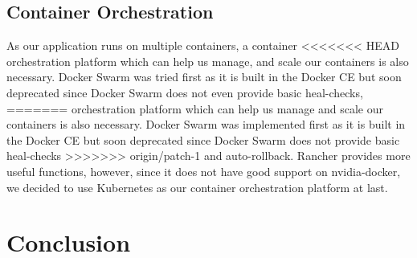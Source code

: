 \documentclass[runningheads]{llncs}
\begin{document}
\subsection{Container Orchestration}
As our application runs on multiple containers, a container 
<<<<<<< HEAD
orchestration platform which can help us manage, and scale 
our containers is also necessary. Docker Swarm was tried 
first as it is built in the Docker CE but soon deprecated 
since Docker Swarm does not even provide basic heal-checks, 
=======
orchestration platform which can help us manage and scale 
our containers is also necessary. Docker Swarm was implemented 
first as it is built in the Docker CE but soon deprecated 
since Docker Swarm does not provide basic heal-checks 
>>>>>>> origin/patch-1
and auto-rollback. Rancher provides more useful functions, 
however, since it does not have good support on 
nvidia-docker, we decided to use Kubernetes as our 
container orchestration platform at last.


\section{Conclusion}
\end{document}
